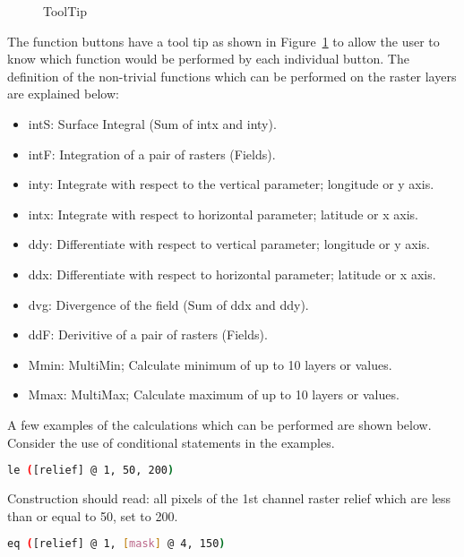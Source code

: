 \begin{figure}[h!]
  \centering
  \caption{ToolTip}
  \label{fig:tooltip}
\end{figure}


The function buttons have a tool tip as shown in Figure~\ref{fig:tooltip} to allow the user to know which function would be performed by each individual button. The definition of the non-trivial functions which can be performed on the raster layers are explained below:
	\begin{itemize}
		\item intS: Surface Integral (Sum of intx and inty).
		\item intF: Integration of a pair of rasters (Fields).
		\item inty: Integrate with respect to the vertical parameter; longitude or y axis.
		\item intx: Integrate with respect to horizontal parameter; latitude or x axis.
		\item ddy: Differentiate with respect to vertical parameter; longitude or y axis.
		\item ddx: Differentiate with respect to horizontal parameter; latitude or x axis.
		\item dvg: Divergence of the field (Sum of ddx and ddy).
		\item ddF: Derivitive of a pair of rasters (Fields). 
		\item Mmin: MultiMin; Calculate minimum of up to 10 layers or values.
		\item Mmax: MultiMax; Calculate maximum of up to 10 layers or values.
	\end{itemize}

A few examples of the calculations which can be performed are shown below. Consider the use of conditional statements in the examples.
\begin{example}
	\begin{lstlisting}[language=bash]
le ([relief] @ 1, 50, 200)
	\end{lstlisting}
\end{example}

Construction should read: all pixels of the 1st channel raster relief which are less than or equal to 50, set to 200.
\begin{example}
	\begin{lstlisting}[language=bash]
eq ([relief] @ 1, [mask] @ 4, 150)
	\end{lstlisting}
\end{example}

